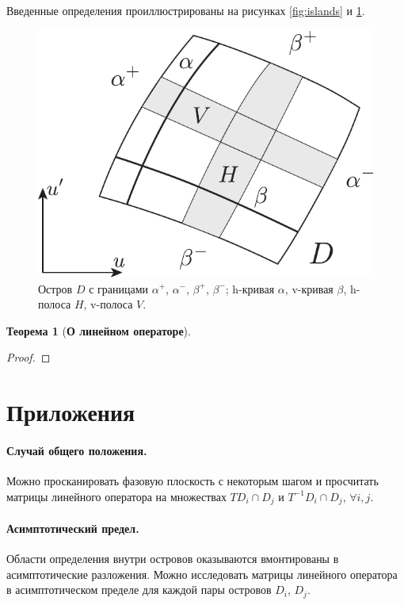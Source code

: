 \documentclass{article}
\newtheorem*{theorem}{Теорема}
\begin{document}
Введенные определения проиллюстрированы на рисунках \ref{fig:islands} и  \ref{fig:curves-and-strips}.

\begin{figure}[h]
\centering
  \includegraphics[scale = 0.8]{pic/curves and strips}
  \caption{Остров $D$ с границами $\alpha^+$, $\alpha^-$, $\beta^+$, $\beta^-$; h-кривая $\alpha$, v-кривая $\beta$, h-полоса $H$, v-полоса $V$.}
\label{fig:curves-and-strips}
\end{figure}

\begin{theorem}[{\bf О линейном операторе}]

\end{theorem}

\begin{proof}
	
\end{proof}

\section*{Приложения}

\paragraph{Случай общего положения.} 

Можно просканировать фазовую плоскость с некоторым шагом и просчитать матрицы линейного оператора на множествах $T D_i \cap D_j$ и $T^{-1} D_i \cap D_j$, $\forall i, j$.

\paragraph{Асимптотический предел.}

Области определения внутри островов оказываются вмонтированы в асимптотические разложения.
Можно исследовать матрицы линейного оператора в асимптотическом пределе для каждой пары островов $D_i$, $D_j$.
\end{document}
